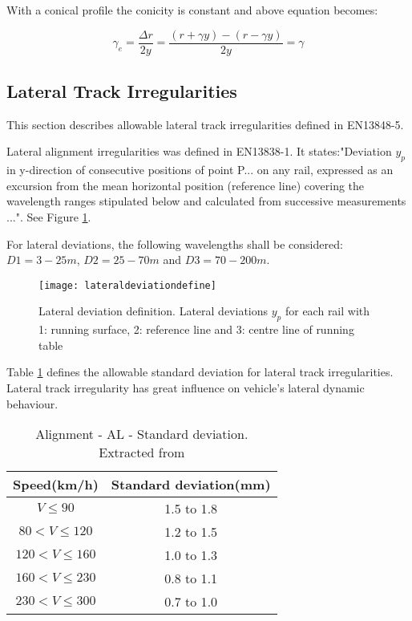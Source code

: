 With a conical profile the conicity is constant and above equation becomes:

$$ \gamma_e = \frac{\Delta r}{2y} =\frac{(r+\gamma y)-(r-\gamma y)}{2y} = \gamma $$

\subsection{Lateral Track Irregularities}\label{sec:lateraltrackirrgularities}
This section describes allowable lateral track irregularities defined in EN13848-5\cite{13848}. 

Lateral alignment irregularities was defined in EN13838-1. It states:"Deviation $y_p$ in y-direction of consecutive positions of point P... on any rail, expressed as an excursion from the mean horizontal position (reference line) covering the wavelength ranges stipulated below and calculated from successive measurements ...". See Figure \ref{fig:lateraldeviationdefine}.

For lateral deviations, the following wavelengths shall be considered: $D1 = 3 -25 m$, $D2 = 25 - 70 m$ and $D3 = 70 - 200 m$. 

\begin{figure}[h]
    \centering
    \texttt{[image: lateraldeviationdefine]}
    \caption{Lateral deviation definition. Lateral deviations $y_p$ for each rail with 1: running surface, 2: reference line and 3: centre line of running table}
    \label{fig:lateraldeviationdefine}
\end{figure}

Table \ref{tab:lateraldeviation} defines the allowable standard deviation for lateral track irregularities. Lateral track irregularity has great influence on vehicle's lateral dynamic behaviour.

\begin{table}[h]
    \centering
    \caption{Alignment - AL - Standard deviation. Extracted from \cite[Table B.6]{13848}}
    \begin{tabular}{cc}
        \hline
        Speed(km/h) & Standard deviation(mm) \\
        \hline
        $V\leq 90$ & 1.5 to 1.8 \\
        $80 < V \leq 120$ & 1.2 to 1.5 \\
        $120 < V \leq 160$ & 1.0 to 1.3 \\
        $160 <V \leq 230$ & 0.8 to 1.1 \\
        $230 <V \leq 300$ & 0.7 to 1.0 \\
        \hline
    \end{tabular}
    \label{tab:lateraldeviation}
\end{table}



